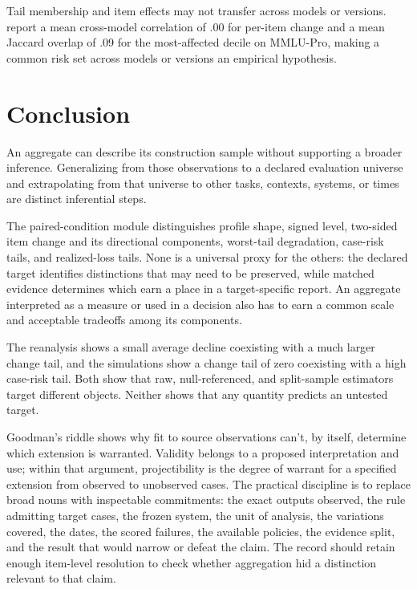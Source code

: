 \documentclass[12pt]{article}
\begin{document}
Tail membership and item effects may not transfer across models or versions. \Textcite[2, 4--6]{zhang2026illusionRobustness} report a mean cross-model correlation of .00 for per-item change and a mean Jaccard overlap of .09 for the most-affected decile on MMLU-Pro, making a common risk set across models or versions an empirical hypothesis.

\section{Conclusion}\label{sec:conclusion}

An aggregate can describe its construction sample without supporting a broader inference. Generalizing from those observations to a declared evaluation universe and extrapolating from that universe to other tasks, contexts, systems, or times are distinct inferential steps.

The paired-condition module distinguishes profile shape, signed level, two-sided item change and its directional components, worst-tail degradation, case-risk tails, and realized-loss tails. None is a universal proxy for the others: the declared target identifies distinctions that may need to be preserved, while matched evidence determines which earn a place in a target-specific report. An aggregate interpreted as a measure or used in a decision also has to earn a common scale and acceptable tradeoffs among its components.

The reanalysis shows a small average decline coexisting with a much larger change tail, and the simulations show a change tail of zero coexisting with a high case-risk tail. Both show that raw, null-referenced, and split-sample estimators target different objects. Neither shows that any quantity predicts an untested target.

Goodman's riddle shows why fit to source observations can't, by itself, determine which extension is warranted. Validity belongs to a proposed interpretation and use; within that argument, projectibility is the degree of warrant for a specified extension from observed to unobserved cases. The practical discipline is to replace broad nouns with inspectable commitments: the exact outputs observed, the rule admitting target cases, the frozen system, the unit of analysis, the variations covered, the dates, the scored failures, the available policies, the evidence split, and the result that would narrow or defeat the claim. The record should retain enough item-level resolution to check whether aggregation hid a distinction relevant to that claim.
\end{document}

